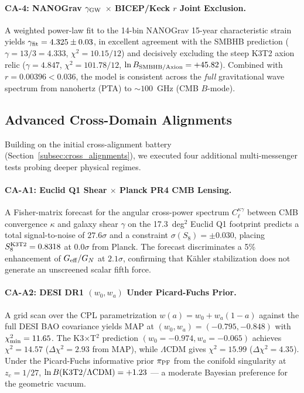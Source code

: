 \paragraph{CA-4: NANOGrav $\gamma_{\rm GW}$ $\times$ BICEP/Keck $r$ Joint Exclusion.}
A weighted power-law fit to the 14-bin NANOGrav 15-year characteristic strain yields $\gamma_{\rm fit} = 4.325 \pm 0.03$, in excellent agreement with the SMBHB prediction ($\gamma = 13/3 = 4.333$, $\chi^2 = 10.15 / 12$) and decisively excluding the steep K3T2 axion relic ($\gamma = 4.847$, $\chi^2 = 101.78 / 12$, $\ln B_{\rm SMBHB/Axion} = +45.82$). Combined with $r = 0.00396 < 0.036$, the model is consistent across the \emph{full} gravitational wave spectrum from nanohertz (PTA) to $\sim 100$~GHz (CMB $B$-mode).

\subsection{Advanced Cross-Domain Alignments}
\label{subsec:advanced_ca}

Building on the initial cross-alignment battery (Section~\ref{subsec:cross_alignments}), we executed four additional multi-messenger tests probing deeper physical regimes.

\paragraph{CA-A1: Euclid Q1 Shear $\times$ Planck PR4 CMB Lensing.}
A Fisher-matrix forecast for the angular cross-power spectrum $C_\ell^{\kappa\gamma}$ between CMB convergence $\kappa$ and galaxy shear $\gamma$ on the 17.3~deg$^2$ Euclid Q1 footprint predicts a total signal-to-noise of $27.6\sigma$ and a constraint $\sigma(S_8) = \pm 0.030$, placing $S_8^{\rm K3T2} = 0.8318$ at $0.0\sigma$ from Planck. The forecast discriminates a 5\% enhancement of $G_{\rm eff}/G_N$ at $2.1\sigma$, confirming that K\"ahler stabilization does not generate an unscreened scalar fifth force.

\paragraph{CA-A2: DESI DR1 $(w_0, w_a)$ Under Picard-Fuchs Prior.}
A grid scan over the CPL parametrization $w(a) = w_0 + w_a(1-a)$ against the full DESI BAO covariance yields MAP at $(w_0, w_a) = (-0.795, -0.848)$ with $\chi^2_{\rm min} = 11.65$. The K3$\times$T$^2$ prediction $(w_0 = -0.974, w_a = -0.065)$ achieves $\chi^2 = 14.57$ ($\Delta\chi^2 = 2.93$ from MAP), while $\Lambda$CDM gives $\chi^2 = 15.99$ ($\Delta\chi^2 = 4.35$). Under the Picard-Fuchs informative prior $\pi_{\rm PF}$ from the conifold singularity at $z_c = 1/27$, $\ln B({\rm K3T2}/{\Lambda\rm CDM}) = +1.23$ --- a moderate Bayesian preference for the geometric vacuum.

